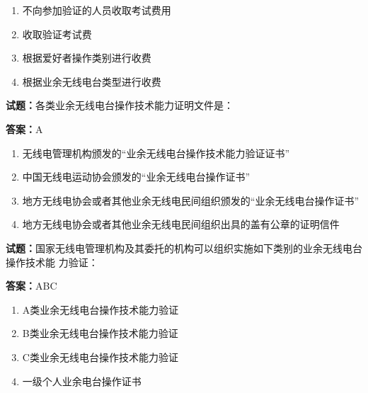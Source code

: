 \documentclass{ctexbook}
\begin{document}
\begin{enumerate}[leftmargin=3em]
  \item 不向参加验证的人员收取考试费用 

  \item 收取验证考试费 

  \item 根据爱好者操作类别进行收费 

  \item 根据业余无线电台类型进行收费 

\end{enumerate}





\vspace{1em}

\textbf{试题：}各类业余无线电台操作技术能力证明文件是： 

\textbf{答案：}A 

\begin{enumerate}[leftmargin=3em]
  \item 无线电管理机构颁发的“业余无线电台操作技术能力验证证书” 

  \item 中国无线电运动协会颁发的“业余无线电台操作证书” 

  \item 地方无线电协会或者其他业余无线电民间组织颁发的“业余无线电台操作证书” 

  \item 地方无线电协会或者其他业余无线电民间组织出具的盖有公章的证明信件 

\end{enumerate}





\vspace{1em}

\textbf{试题：}国家无线电管理机构及其委托的机构可以组织实施如下类别的业余无线电台操作技术能
力验证： 

\textbf{答案：}ABC 

\begin{enumerate}[leftmargin=3em]
  \item A类业余无线电台操作技术能力验证 

  \item B类业余无线电台操作技术能力验证 

  \item C类业余无线电台操作技术能力验证 

  \item 一级个人业余电台操作证书 

\end{enumerate}
\end{document}
